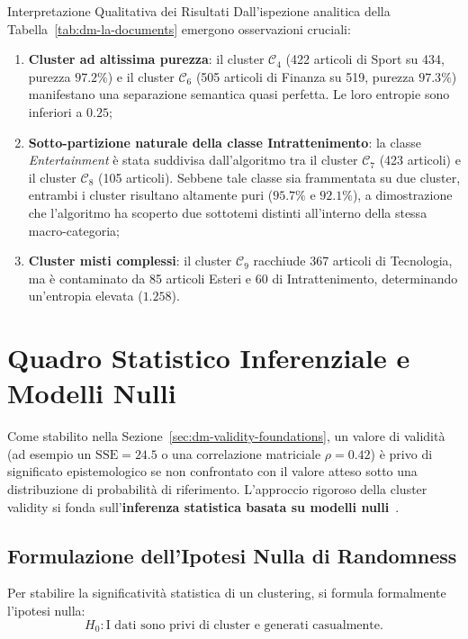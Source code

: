 \begin{noteblock}{Interpretazione Qualitativa dei Risultati}
Dall'ispezione analitica della Tabella~\ref{tab:dm-la-documents} emergono osservazioni cruciali:
\begin{enumerate}
    \item \textbf{Cluster ad altissima purezza}: il cluster $\mathcal{C}_4$ (422 articoli di Sport su 434, purezza $97.2\%$) e il cluster $\mathcal{C}_6$ (505 articoli di Finanza su 519, purezza $97.3\%$) manifestano una separazione semantica quasi perfetta. Le loro entropie sono inferiori a $0.25$;
    \item \textbf{Sotto-partizione naturale della classe Intrattenimento}: la classe \textit{Entertainment} è stata suddivisa dall'algoritmo tra il cluster $\mathcal{C}_7$ (423 articoli) e il cluster $\mathcal{C}_8$ (105 articoli). Sebbene tale classe sia frammentata su due cluster, entrambi i cluster risultano altamente puri ($95.7\%$ e $92.1\%$), a dimostrazione che l'algoritmo ha scoperto due sottotemi distinti all'interno della stessa macro-categoria;
    \item \textbf{Cluster misti complessi}: il cluster $\mathcal{C}_9$ racchiude 367 articoli di Tecnologia, ma è contaminato da 85 articoli Esteri e 60 di Intrattenimento, determinando un'entropia elevata ($1.258$).
\end{enumerate}
\end{noteblock}

\FloatBarrier
\section{Quadro Statistico Inferenziale e Modelli Nulli}
\label{sec:dm-statistical-null-models}

Come stabilito nella Sezione~\ref{sec:dm-validity-foundations}, un valore di validità (ad esempio un $\mathrm{SSE} = 24.5$ o una correlazione matriciale $\rho = 0.42$) è privo di significato epistemologico se non confrontato con il valore atteso sotto una distribuzione di probabilità di riferimento. L'approccio rigoroso della cluster validity si fonda sull'\textbf{inferenza statistica basata su modelli nulli}~\cite{tan2018, jain1988}.

\FloatBarrier
\subsection{Formulazione dell'Ipotesi Nulla di Randomness}
Per stabilire la significatività statistica di un clustering, si formula formalmente l'ipotesi nulla:
\begin{equation}
\label{eq:dm-null-hypothesis}
H_0: \text{I dati sono privi di cluster e generati casualmente.}
\end{equation}

